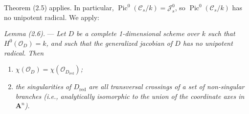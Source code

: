 \documentclass[10pt]{article}
\newcommand{\Pic}{\operatorname{Pic}}
\newcommand{\cO}{\mathcal O}
\newcommand{\A}{\mathbf A}
\begin{document}
Theorem (2.5) applies. In particular, $\Pic^0(\mathscr C_s/k)=\mathscr J_s^0$, so $\Pic^0(\mathscr C_s/k)$ has no unipotent radical. We apply:

\medskip
\noindent\emph{Lemma (2.6).} --- \emph{Let $D$ be a complete 1-dimensional scheme over $k$ such that $H^0(\cO_D)=k$, and such that the generalized jacobian of $D$ has no unipotent radical. Then}
\begin{enumerate}[label=(\roman*)]
\item \emph{$\chi(\cO_D)=\chi(\cO_{D_{\mathrm{red}}})$;}
\item \emph{the singularities of $D_{\mathrm{red}}$ are all transversal crossings of a set of non-singular branches (i.e., analytically isomorphic to the union of the coordinate axes in $\A^n$).}
\end{enumerate}
\end{document}
